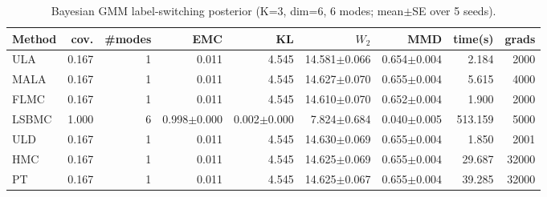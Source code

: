 \begin{table}[t]
\centering
\small
\caption{Bayesian GMM label-switching posterior (K=3, dim=6, 6 modes; mean$\pm$SE over 5 seeds).}
\label{tab:bayes_gmm}
\begin{tabular}{lrrrrrrrr}
\toprule
Method & cov. & \#modes & EMC & KL & $W_2$ & MMD & time(s) & grads \\
\midrule
ULA & 0.167 & 1 & 0.011 & 4.545 & 14.581$\pm$0.066 & 0.654$\pm$0.004 & 2.184 & 2000 \\
MALA & 0.167 & 1 & 0.011 & 4.545 & 14.627$\pm$0.070 & 0.655$\pm$0.004 & 5.615 & 4000 \\
FLMC & 0.167 & 1 & 0.011 & 4.545 & 14.610$\pm$0.070 & 0.652$\pm$0.004 & 1.900 & 2000 \\
LSBMC & 1.000 & 6 & 0.998$\pm$0.000 & 0.002$\pm$0.000 & 7.824$\pm$0.684 & 0.040$\pm$0.005 & 513.159 & 5000 \\
ULD & 0.167 & 1 & 0.011 & 4.545 & 14.630$\pm$0.069 & 0.655$\pm$0.004 & 1.850 & 2001 \\
HMC & 0.167 & 1 & 0.011 & 4.545 & 14.625$\pm$0.069 & 0.655$\pm$0.004 & 29.687 & 32000 \\
PT & 0.167 & 1 & 0.011 & 4.545 & 14.625$\pm$0.067 & 0.655$\pm$0.004 & 39.285 & 32000 \\
\bottomrule
\end{tabular}
\end{table}